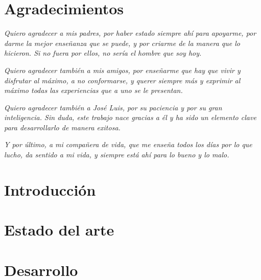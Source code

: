 \documentclass[12pt,a4paper]{report}
\begin{document}
\chapter*{Agradecimientos}
\noindent \textit{Quiero agradecer a mis padres, por haber estado siempre ahí para apoyarme, por darme la mejor enseñanza que se puede, y por criarme de la manera que lo hicieron. Si no fuera por ellos, no sería el hombre que soy hoy.}

\vspace{0.5cm}

\noindent \textit{Quiero agradecer también a mis amigos, por enseñarme que hay que vivir y disfrutar al máximo, a no conformarse, y querer siempre más y exprimir al máximo todas las experiencias que a uno se le presentan.}

\vspace{0.5cm}

\noindent \textit{Quiero agradecer también a José Luis, por su paciencia y por su gran inteligencia. Sin duda, este trabajo nace gracias a él y ha sido un elemento clave para desarrollarlo de manera exitosa. }

\vspace{0.5cm}

\noindent \textit{Y por último, a mi compañera de vida, que me enseña todos los días por lo que lucho, da sentido a mi vida, y siempre está ahí para lo bueno y lo malo. }

\listoffigures



\hypersetup{pageanchor=false}
\hypersetup{linkcolor=black}
\tableofcontents


\chapter{Introducción}
\label{sec:cap1}


\chapter{Estado del arte}
\label{sec:cap2}


\chapter{Desarrollo}
\label{sec:cap3}

\end{document}
